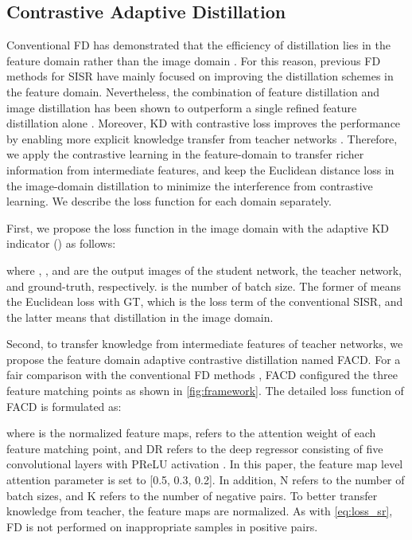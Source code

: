 \documentclass[10pt,twocolumn,letterpaper]{article}
\begin{document}
\subsection{Contrastive Adaptive Distillation }
\label{fcd}
Conventional FD has demonstrated that the efficiency of distillation lies in the feature domain rather than the image domain \cite{fakd}. For this reason, previous FD methods for SISR have mainly focused on improving the distillation schemes in the feature domain. Nevertheless, the combination of feature distillation and image distillation has been shown to outperform a single refined feature distillation alone \cite{fakd, lsfd}. Moreover, KD with contrastive loss improves the performance by enabling more explicit knowledge transfer from teacher networks \cite{csd2021}. Therefore, we apply the contrastive learning in the feature-domain to transfer richer information from intermediate features, and keep the Euclidean distance loss in the image-domain distillation to minimize the interference from contrastive learning. We describe the loss function for each domain separately.

First, we propose the loss function in the image domain with the adaptive KD indicator () as follows:



where , , and  are the output images of the student network, the teacher network, and ground-truth, respectively.  is the number of batch size. The former of  means the Euclidean loss with GT, which is the loss term of the conventional SISR, and the latter means that distillation in the image domain.

Second, to transfer knowledge from intermediate features of teacher networks, we propose the feature domain adaptive contrastive distillation named FACD. For a fair comparison with the conventional FD methods \cite{fakd, lsfd}, FACD configured the three feature matching points as shown in \cref{fig:framework}. The detailed loss function of FACD is formulated as: 






where  is the normalized feature maps,  refers to the attention weight of each feature matching point, and DR refers to the deep regressor consisting of five  convolutional layers with PReLU activation \cite{prelu}. In this paper, the feature map level attention parameter  is set to [0.5, 0.3, 0.2]. In addition, N refers to the number of batch sizes, and K refers to the number of negative pairs. To better transfer knowledge from teacher, the feature maps are normalized. As with \cref{eq:loss_sr}, FD is not performed on inappropriate samples in positive pairs. 
\end{document}
